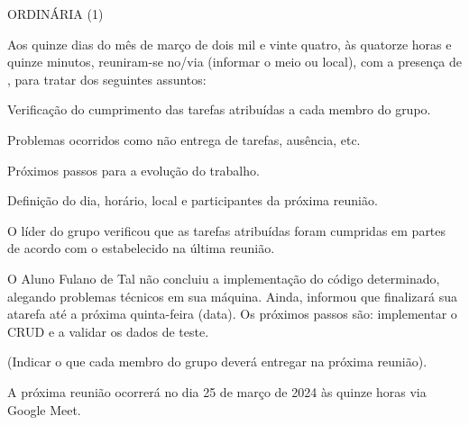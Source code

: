\documentclass[11pt,twoside]{ata}
\date{15 de março de 2024}
\begin{document}
\begin{reuniao}{ORDINÁRIA (1)}

    Aos quinze dias do mês de março de dois mil e vinte quatro, às quatorze horas e quinze minutos, reuniram-se no/via (informar o meio ou local), com a presença de , para tratar dos seguintes assuntos:

    \begin{informes}
        \item Verificação do cumprimento das tarefas atribuídas a cada membro do grupo.
        \item Problemas ocorridos como não entrega de tarefas, ausência, etc.
        \item Próximos passos para a evolução do trabalho.        
        \item Definição do dia, horário, local e participantes da próxima reunião.
    \end{informes}
 
    \begin{assuntos}
        \item O líder do grupo verificou que as tarefas atribuídas foram cumpridas em partes de acordo com o estabelecido na última reunião.
        \item O Aluno Fulano de Tal não concluiu a implementação do código determinado, alegando problemas técnicos em sua máquina. Ainda, informou que finalizará sua atarefa até a próxima quinta-feira (data). Os próximos passos são: implementar o CRUD e a validar os dados de teste.
        \item (Indicar o que cada membro do grupo deverá entregar na próxima reunião).
        \item A próxima reunião ocorrerá no dia 25 de março de 2024 às quinze horas via Google Meet.
\end{assuntos}
\end{reuniao}

\end{document}
